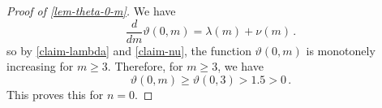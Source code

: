 \begin{proof}[Proof of \cref{lem-theta-0-m}]
   We have  
   \[
      \frac{d}{dm} \vartheta(0, m) = \lambda(m) + \nu(m)\,.
   \]
   so by \cref{claim-lambda} and \cref{claim-nu}, 
   the function $\vartheta(0, m)$ is monotonely increasing for $m \geq 3$.
   Therefore, for $m \geq 3$, we have 
   \[
      \vartheta(0, m) \geq  \vartheta(0, 3) > 1.5 > 0\,.
   \]
   This proves this  for $n = 0$.









\end{proof}
